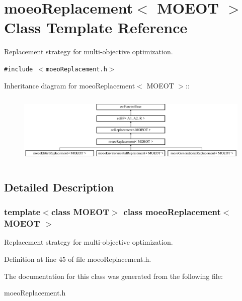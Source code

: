 \section{moeo\-Replacement$<$ MOEOT $>$ Class Template Reference}
\label{classmoeoReplacement}
Replacement strategy for multi-objective optimization.  


{\tt \#include $<$moeo\-Replacement.h$>$}

Inheritance diagram for moeo\-Replacement$<$ MOEOT $>$::\begin{figure}[H]
\begin{center}
\leavevmode
\includegraphics[height=3.43137cm]{classmoeoReplacement}
\end{center}
\end{figure}


\subsection{Detailed Description}
\subsubsection*{template$<$class MOEOT$>$ class moeo\-Replacement$<$ MOEOT $>$}

Replacement strategy for multi-objective optimization. 



Definition at line 45 of file moeo\-Replacement.h.

The documentation for this class was generated from the following file:\begin{CompactItemize}
\item 
moeo\-Replacement.h\end{CompactItemize}
